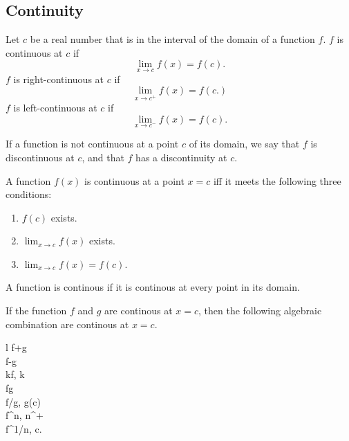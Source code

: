 \documentclass[oneside]{book}
\begin{document}
\subsection{Continuity}
\begin{definition}[Continuity]
	Let \(c\) be a real number that is in the interval of the domain of a function \(f\). \(f\) is continuous at \(c\) if
	\begin{equation*}
		\lim_{x\rightarrow c}f(x)=f(c).
	\end{equation*}
	\(f\) is right-continuous at \(c\) if
	\begin{equation*}
		\lim_{x\rightarrow c^+}f(x)=f(c.)
	\end{equation*}
	\(f\) is left-continuous at \(c\) if
	\begin{equation*}
		\lim_{x\rightarrow c^-}f(x)=f(c).
	\end{equation*}
\end{definition}
\begin{remark}
	If a function is not continuous at a point \(c\) of its domain, we say that \(f\) is discontinuous at \(c\), and that \(f\) has a discontinuity at \(c\).
\end{remark}
\begin{proposition}
	A function \(f(x)\) is continuous at a point \(x=c\) iff it meets the following three conditions:
	\begin{enumerate}
		\item \(f(c)\) exists.
		\item \(\lim_{x\rightarrow c}f(x)\) exists.
		\item \(\lim_{x\rightarrow c}f(x)=f(c)\).
	\end{enumerate}
\end{proposition}
\begin{definition}
	A function is continous if it is continous at every point in its domain.
\end{definition}
\begin{theorem}
	If the function \(f\) and \(g\) are continous at \(x=c\), then the following algebraic combination are continous at \(x=c\).
	\begin{IEEEeqnarray*}{l}
		f+g\\
		f-g\\
		k\cdot f,\; k\in{}\\
		f\cdot g\\
		f/g,\; g(c)\\
		f^n,\; n\in{}^+\\
		f^{1/n},\; c.
	\end{IEEEeqnarray*}
\end{theorem}
\end{document}
